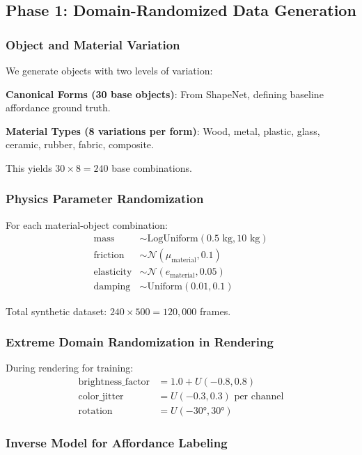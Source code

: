\documentclass[11pt]{article}
\begin{document}
\subsection{Phase 1: Domain-Randomized Data Generation}

\subsubsection{Object and Material Variation}

We generate objects with two levels of variation:

\textbf{Canonical Forms (30 base objects)}: From ShapeNet, defining baseline affordance ground truth.

\textbf{Material Types (8 variations per form)}: Wood, metal, plastic, glass, ceramic, rubber, fabric, composite.

This yields $30 \times 8 = 240$ base combinations.

\subsubsection{Physics Parameter Randomization}

For each material-object combination:
\begin{align}
\text{mass} &\sim \text{LogUniform}(0.5 \text{ kg}, 10 \text{ kg}) \\
\text{friction} &\sim \mathcal{N}(\mu_{\text{material}}, 0.1) \\
\text{elasticity} &\sim \mathcal{N}(e_{\text{material}}, 0.05) \\
\text{damping} &\sim \text{Uniform}(0.01, 0.1)
\end{align}

Total synthetic dataset: $240 \times 500 = 120,000$ frames.

\subsubsection{Extreme Domain Randomization in Rendering}

During rendering for training:
\begin{align}
\text{brightness\_factor} &= 1.0 + U(-0.8, 0.8) \\
\text{color\_jitter} &= U(-0.3, 0.3) \text{ per channel} \\
\text{rotation} &= U(-30°, 30°)
\end{align}

\subsubsection{Inverse Model for Affordance Labeling}
\end{document}
